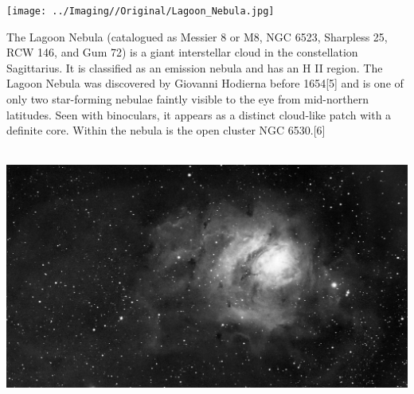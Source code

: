 \texttt{[image: ../Imaging//Original/Lagoon\_Nebula.jpg]}
{\footnotesize\color{white}
The Lagoon Nebula (catalogued as Messier 8 or M8, NGC 6523, Sharpless 25, RCW 146, and Gum 72) is a giant interstellar cloud in the constellation Sagittarius. It is classified as an emission nebula and has an H II region. The Lagoon Nebula was discovered by Giovanni Hodierna before 1654[5] and is one of only two star-forming nebulae faintly visible to the eye from mid-northern latitudes. Seen with binoculars, it appears as a distinct cloud-like patch with a definite core. Within the nebula is the open cluster NGC 6530.[6]


}\ \\
\includegraphics[width=\textwidth]{../Imaging//Grayscale/Lagoon_Nebula.jpg}

